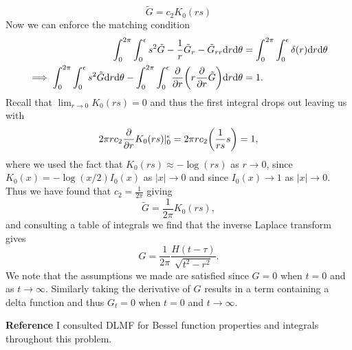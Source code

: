 \documentclass[12pt]{report}
\begin{document}
\begin{solution}
\begin{enumerate}
        \[
          \tilde{G} = c_2K_0(rs)  
        \] 
        Now we can enforce the matching condition
        \begin{align*}
            \int_0^{2\pi}\int_0^{\epsilon} s^2 \tilde{G} - \frac{1}{r}\tilde{G}_r - \tilde{G}_{rr} {\mathrm{d}} r {\mathrm{d}} \theta &= \int_0^{2\pi}\int_0^{\epsilon} \delta(r) {\mathrm{d}} r {\mathrm{d}} \theta\\
            \implies \int_0^{2\pi}\int_0^{\epsilon} s^2 \tilde{G} {\mathrm{d}} r {\mathrm{d}} \theta - \int_0^{2\pi}\int_0^{\epsilon} \frac{\partial }{\partial r}{\left(r\frac{\partial }{\partial r}\tilde{G}\right)}{\mathrm{d}} r {\mathrm{d}} \theta &= 1.
        \end{align*}
        Recall that $\lim_{r\to 0 }K_0(rs) = 0$ and thus the first integral drops out leaving us with
        \[
            2\pi r c_2 \frac{\partial }{\partial r}K_0(rs)|_0^{\epsilon} = 2\pi r c_2 {\left(\frac{1}{rs} s\right)} = 1,
        \]
        where we used the fact that $K_0(rs) \approx -\log(rs)$ as $r\to 0$, since $K_0(x) = - \log(x/2)I_0(x)$ as $|x| \to 0$ and since $I_0(x) \to 1$ as $|x| \to 0$. Thus we have found that $c_2 = \frac{1}{2\pi}$ giving 
        \[
            \tilde{G} = \frac{1}{2\pi} K_0(rs),
        \] 
        and consulting a table of integrals we find that the inverse Laplace transform gives
        \[
          G = \frac{1}{2\pi} \frac{H(t - \tau)}{\sqrt{t^2 - r^2}}.
        \]
        We note that the assumptions we made are satisfied since $G=0$ when $t=0$ and as $t\to\infty$. Similarly taking the derivative of $G$ results in a term containing a delta function and thus $G_t = 0$ when $t=0$ and $t\to\infty$.




    \end{enumerate}
    {\bf Reference}
    I consulted DLMF for Bessel function properties and integrals throughout this problem.
\end{solution}

\newpage
\end{document}
